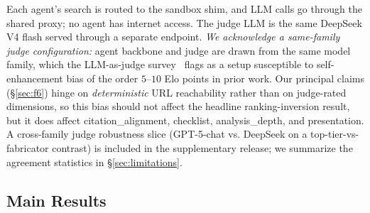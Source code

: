 \documentclass{article}
\begin{document}
Each agent's search is routed to the sandbox shim, and LLM calls go through the shared proxy; no agent has internet access. The judge LLM is the same DeepSeek V4 flash served through a separate endpoint. \emph{We acknowledge a same-family judge configuration:} agent backbone and judge are drawn from the same model family, which the LLM-as-judge survey~\citep{llmjudge2024} flags as a setup susceptible to self-enhancement bias of the order $5$--$10$ Elo points in prior work. Our principal claims (\S\ref{sec:f6}) hinge on \emph{deterministic} URL reachability rather than on judge-rated dimensions, so this bias should not affect the headline ranking-inversion result, but it does affect citation\_alignment, checklist, analysis\_depth, and presentation. A cross-family judge robustness slice (GPT-5-chat vs. DeepSeek on a top-tier-vs-fabricator contrast) is included in the supplementary release; we summarize the agreement statistics in \S\ref{sec:limitations}.

\subsection{Main Results}
\end{document}
